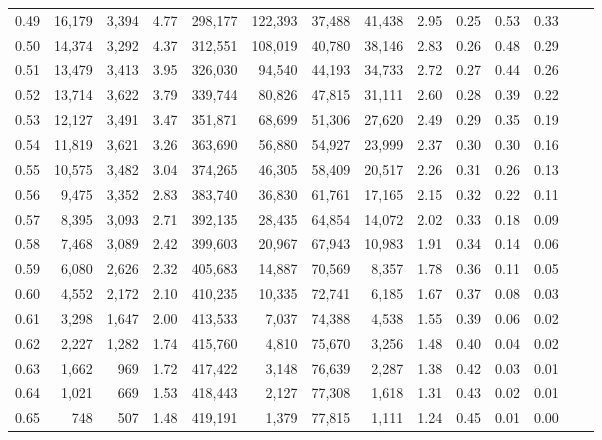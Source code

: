\begin{tabular}{rrrrrrrrrrrrrr}
0.49 &  16,179 &  3,394 &    4.77 &  298,177 &  122,393 &  37,488 &  41,438 &  2.95 &  0.25 &  0.53 &      0.33 \\
0.50 &  14,374 &  3,292 &    4.37 &  312,551 &  108,019 &  40,780 &  38,146 &  2.83 &  0.26 &  0.48 &      0.29 \\
0.51 &  13,479 &  3,413 &    3.95 &  326,030 &   94,540 &  44,193 &  34,733 &  2.72 &  0.27 &  0.44 &      0.26 \\
0.52 &  13,714 &  3,622 &    3.79 &  339,744 &   80,826 &  47,815 &  31,111 &  2.60 &  0.28 &  0.39 &      0.22 \\
0.53 &  12,127 &  3,491 &    3.47 &  351,871 &   68,699 &  51,306 &  27,620 &  2.49 &  0.29 &  0.35 &      0.19 \\
0.54 &  11,819 &  3,621 &    3.26 &  363,690 &   56,880 &  54,927 &  23,999 &  2.37 &  0.30 &  0.30 &      0.16 \\
0.55 &  10,575 &  3,482 &    3.04 &  374,265 &   46,305 &  58,409 &  20,517 &  2.26 &  0.31 &  0.26 &      0.13 \\
0.56 &   9,475 &  3,352 &    2.83 &  383,740 &   36,830 &  61,761 &  17,165 &  2.15 &  0.32 &  0.22 &      0.11 \\
0.57 &   8,395 &  3,093 &    2.71 &  392,135 &   28,435 &  64,854 &  14,072 &  2.02 &  0.33 &  0.18 &      0.09 \\
0.58 &   7,468 &  3,089 &    2.42 &  399,603 &   20,967 &  67,943 &  10,983 &  1.91 &  0.34 &  0.14 &      0.06 \\
0.59 &   6,080 &  2,626 &    2.32 &  405,683 &   14,887 &  70,569 &   8,357 &  1.78 &  0.36 &  0.11 &      0.05 \\
0.60 &   4,552 &  2,172 &    2.10 &  410,235 &   10,335 &  72,741 &   6,185 &  1.67 &  0.37 &  0.08 &      0.03 \\
0.61 &   3,298 &  1,647 &    2.00 &  413,533 &    7,037 &  74,388 &   4,538 &  1.55 &  0.39 &  0.06 &      0.02 \\
0.62 &   2,227 &  1,282 &    1.74 &  415,760 &    4,810 &  75,670 &   3,256 &  1.48 &  0.40 &  0.04 &      0.02 \\
0.63 &   1,662 &    969 &    1.72 &  417,422 &    3,148 &  76,639 &   2,287 &  1.38 &  0.42 &  0.03 &      0.01 \\
0.64 &   1,021 &    669 &    1.53 &  418,443 &    2,127 &  77,308 &   1,618 &  1.31 &  0.43 &  0.02 &      0.01 \\
0.65 &     748 &    507 &    1.48 &  419,191 &    1,379 &  77,815 &   1,111 &  1.24 &  0.45 &  0.01 &      0.00 \\

\end{tabular}

